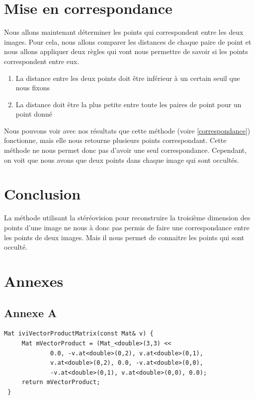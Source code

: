\documentclass[a4paper,10pt]{article}
\begin{document}
\section{Mise en correspondance}
Nous allons maintenant déterminer les points qui correspondent entre les deux images. Pour cela, nous 
allons comparer les distances de chaque paire de point et nous allons appliquer deux règles qui vont 
nous permettre de savoir si les points correspondent entre eux.
\begin{enumerate}
 \item La distance entre les deux points doit être inférieur à un certain seuil que nous fixons
 \item La distance doit être la plus petite entre toute les paires de point pour un point donné
\end{enumerate}
Nous pouvons voir avec nos résultats que cette méthode (voire \ref{correspondance}) fonctionne, mais elle nous retourne plusieurs
points correspondant. Cette méthode ne nous permet donc pas d'avoir une seul correspondance. Cependant, on voit que nous avons
que deux points dans chaque image qui sont occultés.

\section{Conclusion}
La méthode utilisant la stéréovision pour reconstruire la troisième dimension des points d'une image
ne nous à donc pas permis de faire une correspondance entre les points de deux images. Mais il nous permet
de connaitre les points qui sont occulté.
\section{Annexes}
\subsection{Annexe A}
\label{AproduitVector}
\begin{lstlisting}[caption=Calcul produit vectoriel]
 Mat iviVectorProductMatrix(const Mat& v) {
     Mat mVectorProduct = (Mat_<double>(3,3) <<
             0.0, -v.at<double>(0,2), v.at<double>(0,1),
             v.at<double>(0,2), 0.0, -v.at<double>(0,0),
             -v.at<double>(0,1), v.at<double>(0,0), 0.0);
     return mVectorProduct;
 }
\end{lstlisting}
\end{document}
